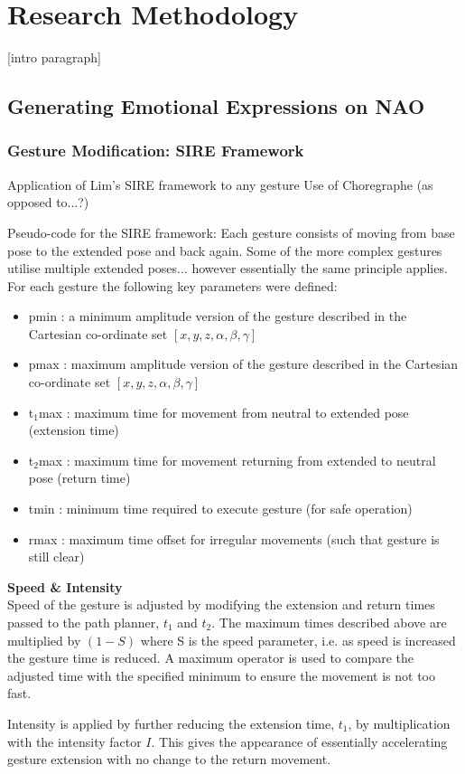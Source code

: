 \documentclass[11pt,a4paper]{report}
\begin{document}
\chapter{Research Methodology}
[intro paragraph]
\section{Generating Emotional Expressions on NAO}
\subsection{Gesture Modification: SIRE Framework}
Application of Lim's SIRE framework to any gesture
Use of Choregraphe (as opposed to...?)

Pseudo-code for the SIRE framework:
Each gesture consists of moving from base pose to the extended pose and back again. Some of the more complex gestures utilise multiple extended poses... however essentially the same principle applies. For each gesture the following key parameters were defined:
\begin{itemize}
\item pmin : a minimum amplitude version of the gesture described in the Cartesian co-ordinate set $[x,y,z,\alpha,\beta,\gamma]$
\item pmax : maximum amplitude version of the gesture described in the Cartesian co-ordinate set $[x,y,z,\alpha,\beta,\gamma]$
\item t$_{1}$max : maximum time for movement from neutral to extended pose (extension time)
\item t$_{2}$max : maximum time for movement returning from extended to neutral pose (return time)
\item tmin : minimum time required to execute gesture (for safe operation)
\item rmax : maximum time offset for irregular movements (such that gesture is still clear)
\end{itemize}

\textbf{Speed \& Intensity}
\\Speed of the gesture is adjusted by modifying the extension and return times passed to the path planner, $t_{1}$ and $t_{2}$. The maximum times described above are multiplied by $(1-S)$ where S is the speed parameter, i.e. as speed is increased the gesture time is reduced. A maximum operator is used to compare the adjusted time with the specified minimum to ensure the movement is not too fast.

Intensity is applied by further reducing the extension time, $t_{1}$, by multiplication with the intensity factor $I$. This gives the appearance of essentially accelerating gesture extension with no change to the return movement. 
\end{document}

